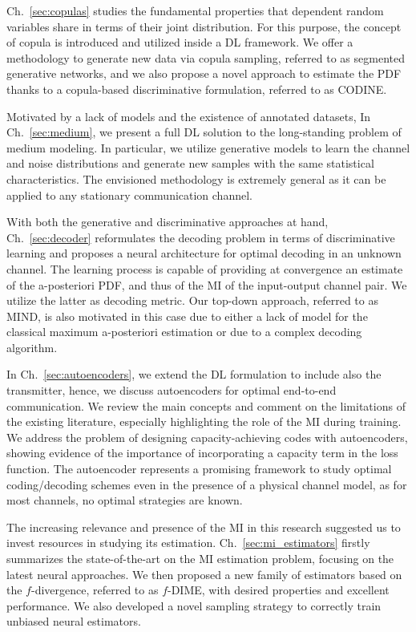 Ch.~\ref{sec:copulas} studies the fundamental properties that dependent random variables share in terms of their joint distribution. For this purpose, the concept of copula is introduced and utilized inside a DL framework. We offer a methodology to generate new data via copula sampling, referred to as segmented generative networks, and we also propose a novel approach to estimate the PDF thanks to a copula-based discriminative formulation, referred to as CODINE.

Motivated by a lack of models and the existence of annotated datasets, In Ch.~\ref{sec:medium}, we present a full DL solution to the long-standing problem of medium modeling. In particular, we utilize generative models to learn the channel and noise distributions and generate new samples with the same statistical characteristics. The envisioned methodology is extremely general as it can be applied to any stationary communication channel. 

With both the generative and discriminative approaches at hand, Ch.~\ref{sec:decoder} reformulates the decoding problem in terms of discriminative learning and proposes a neural architecture for optimal decoding in an unknown channel. The learning process is capable of providing at convergence an estimate of the a-posteriori PDF, and thus of the MI of the input-output channel pair. We utilize the latter as decoding metric. Our top-down approach, referred to as MIND, is also motivated in this case due to either a lack of model for the classical maximum a-posteriori estimation or due to a complex decoding algorithm.

In Ch.~\ref{sec:autoencoders}, we extend the DL formulation to include also the transmitter, hence, we discuss autoencoders for optimal end-to-end communication. We review the main concepts and comment on the limitations of the existing literature, especially highlighting the role of the MI during training. We address the problem of designing capacity-achieving codes with autoencoders, showing evidence of the importance of incorporating a capacity term in the loss function. 
The autoencoder represents a promising framework to study optimal coding/decoding schemes even in the presence of a physical channel model, as for most channels, no optimal strategies are known.

The increasing relevance and presence of the MI in this research suggested us to invest resources in studying its estimation. Ch.~\ref{sec:mi_estimators} firstly summarizes the state-of-the-art on the MI estimation problem, focusing on the latest neural approaches. We then proposed a new family of estimators based on the $f$-divergence, referred to as $f$-DIME, with desired properties and excellent performance. We also developed a novel sampling strategy to correctly train unbiased neural estimators. 

